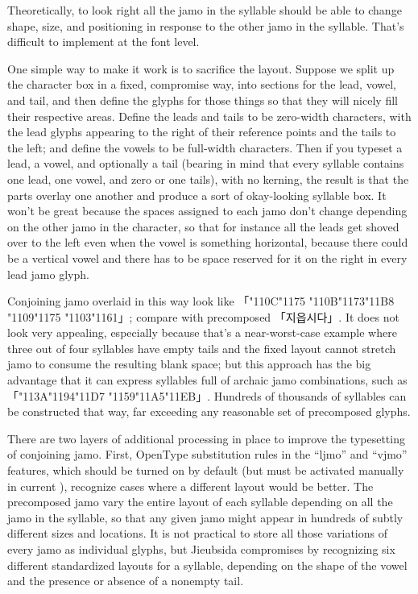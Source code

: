 \documentclass[14pt]{extarticle}
\begin{document}
Theoretically, to look right all the jamo in
the syllable should be able to change shape, size, and positioning in
response to the other jamo in the syllable.  That's difficult to implement
at the font level.

One simple way to make it work is to sacrifice the layout.  Suppose we split
up the character box in a fixed, compromise way, into sections for the lead,
vowel, and tail, and then define the glyphs for those things so that they
will nicely fill their respective areas.  Define the leads and tails to be
zero-width characters, with the lead glyphs appearing to the right of their
reference points and the tails to the left; and define the vowels to be
full-width characters.  Then if you typeset a lead, a vowel, and optionally
a tail (bearing in mind that every syllable contains one lead, one vowel,
and zero or one tails), with no kerning, the result is that the parts
overlay one another and produce a sort of okay-looking syllable box.  It
won't be great because the spaces assigned to each jamo don't change
depending on the other jamo in the character, so that for instance all the
leads get shoved over to the left even when the vowel is something
horizontal, because there could be a vertical vowel and there has to be
space reserved for it on the right in every lead jamo glyph.

Conjoining jamo overlaid in this way look like
{%
「\char"110C\char"1175%
\char"110B\char"1173\char"11B8%
\char"1109\char"1175%
\char"1103\char"1161」}; compare with precomposed {\dodum 「지읍시다」}.  It
does not look very appealing, especially because that's a near-worst-case
example where three out of four syllables have empty tails and the fixed
layout cannot stretch jamo to consume the resulting blank space; but this
approach has the big advantage that it can express syllables full of archaic
jamo combinations, such as {\dodum 「\char"113A\char"1194\char"11D7%
\char"1159\char"11A5\char"11EB」}.  Hundreds of thousands of syllables can
be constructed that way, far exceeding any reasonable set of precomposed
glyphs.

There are two layers of additional processing in place to improve the
typesetting of conjoining jamo.  First, OpenType substitution rules in the
``ljmo'' and ``vjmo'' features, which should be turned on by default (but
must be activated manually in current \XeTeX), recognize cases where a
different layout would be better. The precomposed jamo vary the entire
layout of each syllable depending on all the jamo in the syllable, so that
any given jamo might appear in hundreds of subtly different sizes and
locations.  It is not practical to store all those variations of every jamo
as individual glyphs, but Jieubsida compromises by recognizing six different
standardized layouts for a syllable, depending on the shape of the vowel and
the presence or absence of a nonempty tail.
\end{document}
